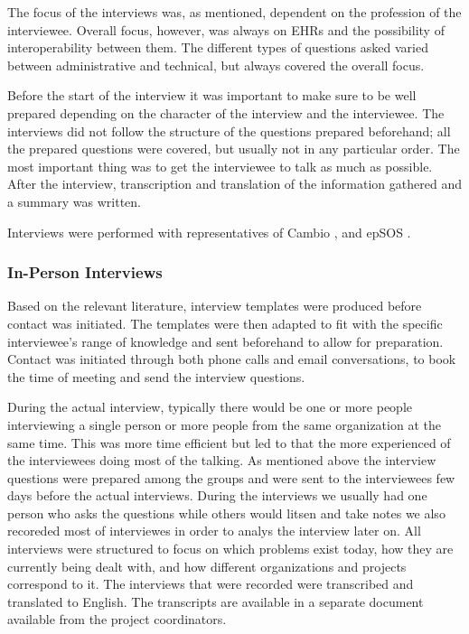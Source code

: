 \documentclass[14pt]{article}
\begin{document}
The focus of the interviews was, as mentioned, dependent on the profession of the interviewee. Overall focus, however, was always on EHRs and the possibility of interoperability between them. The different types of questions asked varied between administrative and technical, but always covered the overall focus. 

Before the start of the interview it was important to make sure to be well prepared depending on the character of the interview and the interviewee. The interviews did not follow the structure of the questions prepared beforehand; all the prepared questions were covered, but usually not in any particular order. The most important thing was to get the interviewee to talk as much as possible. After the interview, transcription and translation of the information gathered and a summary was written.

Interviews were performed with representatives of Cambio \cite{Cambio}, and epSOS \cite{epSOS}.

\subsubsection{In-Person Interviews}

Based on the relevant literature, interview templates were produced before contact was initiated. The templates were then adapted to fit with the specific interviewee's range of knowledge and sent beforehand to allow for preparation. Contact was initiated through both phone calls and email conversations, to book the time of meeting and send the interview questions.

During the actual interview, typically there would be one or more people interviewing a single person or more people from the same organization at the same time. This was more time efficient but led to that the more experienced of the interviewees doing most of the talking. As mentioned above the interview questions were prepared among the groups and were sent to the interviewees few days before the actual interviews. During the interviews we usually had one person who asks the questions while others would litsen and take notes we also recoreded most of  interviewes in order to analys the interview later on. All interviews were structured to focus on which problems exist today, how they are currently being dealt with, and how different organizations and projects correspond to it. The interviews that were recorded were transcribed and translated to English. The transcripts are available in a separate document available from the project coordinators.
\end{document}
